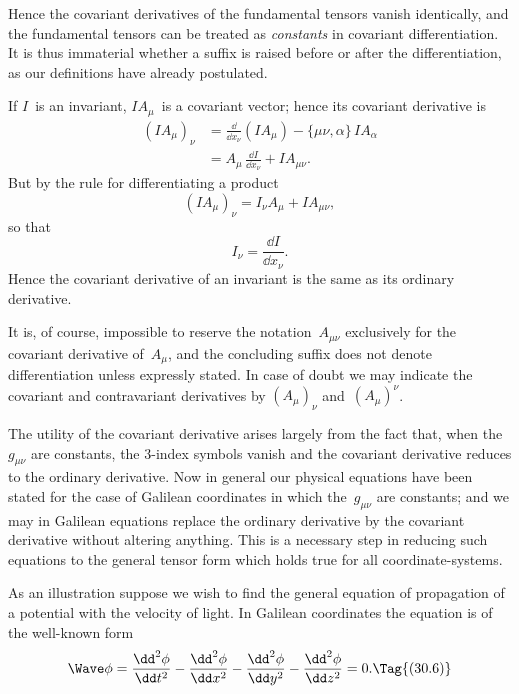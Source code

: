 \documentclass[12pt]{book}
\begin{document}
Hence the covariant derivatives of the fundamental tensors vanish identically,
and the fundamental tensors can be treated as \emph{constants} in covariant
differentiation. It is thus immaterial whether a suffix is raised before or after
the differentiation, as our definitions have already postulated.

If $I$~is an invariant, $IA_{\mu}$~is a covariant vector; hence its covariant
derivative is
\begin{align*}
  (IA_{\mu})_{\nu} &= \frac{\dd}{\dd x_{\nu}}(IA_{\mu}) - \{\mu\nu, \alpha\}\, IA_{\alpha} \\
  &= A_{\mu}\, \frac{\dd I}{\dd x_{\nu}} + IA_{\mu\nu}.
\end{align*}
But by the rule for differentiating a product~
\[
(IA_{\mu})_{\nu} = I_{\nu} A_{\mu} + IA_{\mu\nu},
\]
so that
\[
I_{\nu} = \frac{\dd I}{\dd x_{\nu}}.
\]
Hence the covariant derivative of an invariant is the same as its ordinary
derivative.

It is, of course, impossible to reserve the notation~$A_{\mu\nu}$ exclusively for the
covariant derivative of~$A_{\mu}$, and the concluding suffix does not denote differentiation
unless expressly stated. In case of doubt we may indicate the covariant
and contravariant derivatives by $(A_{\mu})_{\nu}$ and~$(A_{\mu})^{\nu}$.

The utility of the covariant derivative arises largely from the fact that, when
the~$g_{\mu\nu}$ are constants, the $3$-index symbols vanish and the covariant derivative
reduces to the ordinary derivative. Now in general our physical equations
have been stated for the case of Galilean coordinates in which the~$g_{\mu\nu}$ are
constants; and we may in Galilean equations replace the ordinary derivative
by the covariant derivative without altering anything. This is a necessary
step in reducing such equations to the general tensor form which holds true
for all coordinate-systems.

As an illustration suppose we wish to find the general equation of propagation
%
of a potential with the velocity of light. In Galilean coordinates the
equation is of the well-known form
\[
\Wave\phi
  = \frac{\dd^{2} \phi}{\dd t^{2}}
  - \frac{\dd^{2} \phi}{\dd x^{2}}
  - \frac{\dd^{2} \phi}{\dd y^{2}}
  - \frac{\dd^{2} \phi}{\dd z^{2}} = 0.
\Tag{(30.6)}
\]
\end{document}
